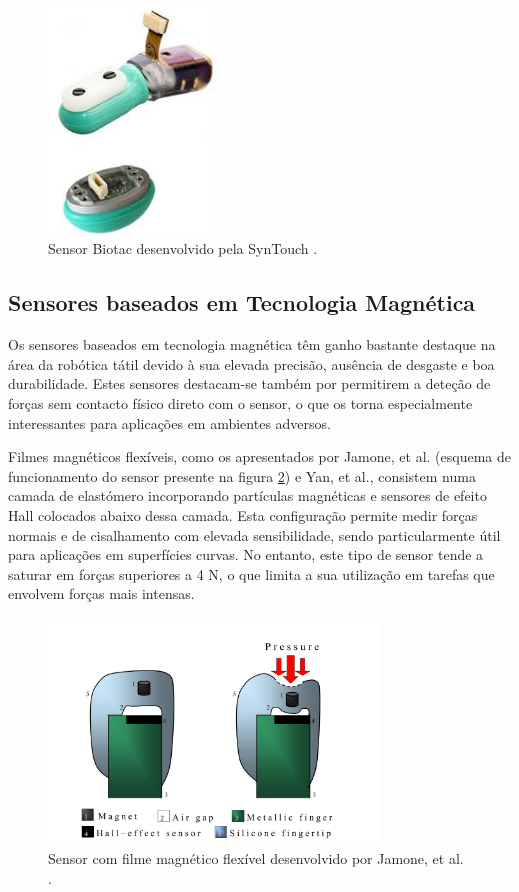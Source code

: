 \begin{figure}[H]
    \centering
    \includegraphics[height=6cm,keepaspectratio]{figs/chapter2/biotac.jpeg}
    \caption{Sensor Biotac desenvolvido pela SynTouch \cite{Biotac12}.}
    \label{fig:biotac}
    
\end{figure}

\subsection{Sensores baseados em Tecnologia Magnética}

Os sensores baseados em tecnologia magnética têm ganho bastante destaque na área da robótica tátil devido à sua elevada precisão, ausência de desgaste e boa durabilidade. Estes sensores destacam-se também por permitirem a deteção de forças sem contacto físico direto com o sensor, o que os torna especialmente interessantes para aplicações em ambientes adversos.

Filmes magnéticos flexíveis, como os apresentados por Jamone, et al. \cite{Jamone2015} (esquema de funcionamento do sensor presente na figura \ref{fig:imagem4}) e  Yan, et al.\cite{Yan2021}, consistem numa camada de elastómero incorporando partículas magnéticas e sensores de efeito Hall colocados abaixo dessa camada. Esta configuração permite medir forças normais e de cisalhamento com elevada sensibilidade, sendo particularmente útil para aplicações em superfícies curvas. No entanto, este tipo de sensor tende a saturar em forças superiores a 4 N, o que limita a sua utilização em tarefas que envolvem forças mais intensas.

\begin{figure}[H]
\centering
\includegraphics[height=6cm,keepaspectratio]{figs/chapter2/sensor_hall.png}
\caption{Sensor com filme magnético flexível desenvolvido por Jamone, et al. \cite{Jamone2015}.}
\label{fig:imagem4}
\end{figure}



